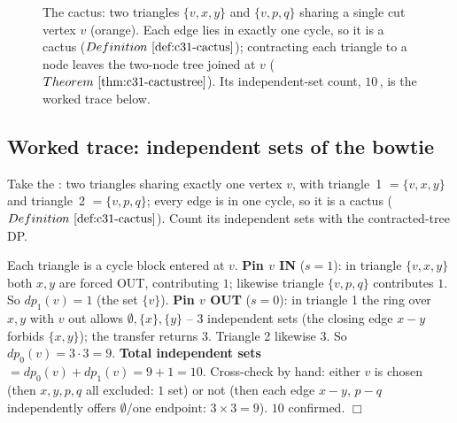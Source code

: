 \begin{figure}[H]
\centering
{}
\caption{The  cactus: two triangles \(\{v,x,y\}\) and \(\{v,p,q\}\) sharing a
single cut vertex \(v\) (orange).  Each edge lies in exactly one cycle, so it is a cactus
(\(\defref{c31-cactus}\)); contracting each triangle to a node leaves the two-node tree
joined at \(v\) (\(\thmref{c31-cactustree}\)).  Its independent-set count, \(10\,\), is the
worked trace below.}
\label{fig:c31-cactus}
\end{figure}

\subsection{Worked trace: independent sets of the bowtie}

Take the : two triangles sharing exactly one vertex \(v\), with
triangle~1 \(=\{v,x,y\}\) and triangle~2 \(=\{v,p,q\}\); every edge is in one cycle,
so it is a cactus (\(\defref{c31-cactus}\)).  Count its independent sets with the
contracted-tree DP.

\begin{tracebox}
Each triangle is a cycle block entered at \(v\).  \textbf{Pin \(v\) IN}
(\(s{=}1\)): in triangle \(\{v,x,y\}\) both \(x,y\) are forced OUT, contributing
\(1\); likewise triangle \(\{v,p,q\}\) contributes \(1\).  So
\(\mathit{dp}_1(v)=1\) (the set \(\{v\}\)).  \textbf{Pin \(v\) OUT} (\(s{=}0\)): in
triangle 1 the ring over \(x,y\) with \(v\) out allows \(\emptyset,\{x\},\{y\}\)
-- \(3\) independent sets (the closing edge \(x\!-\!y\) forbids \(\{x,y\}\)); the
transfer  returns \(3\).  Triangle 2 likewise \(3\).  So
\(\mathit{dp}_0(v)=3\cdot3=9\).  \textbf{Total independent sets} \(=\mathit{dp}_0(v)+
\mathit{dp}_1(v)=9+1=\boxed{10}\).  Cross-check by hand: either \(v\) is chosen
(then \(x,y,p,q\) all excluded: \(1\) set) or not (then each edge \(x\!-\!y\),
\(p\!-\!q\) independently offers \(\emptyset/\text{one endpoint}\): \(3\times3=9\)).
\(10\) confirmed. \(\Box\)
\end{tracebox}

